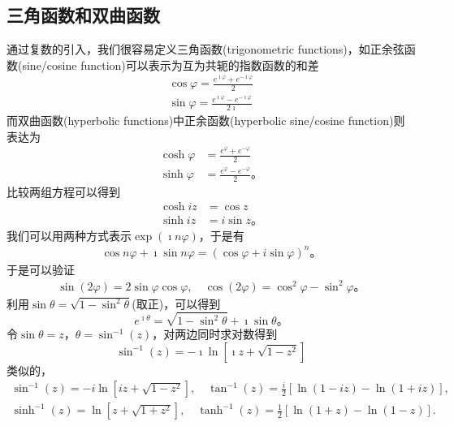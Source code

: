 \subsection{三角函数和双曲函数}
通过复数的引入，我们很容易定义三角函数(trigonometric functions)，如正余弦函数(sine/cosine function)可以表示为互为共轭的指数函数的和差
\begin{align}
    \cos \varphi = \frac{e^{\imath \varphi} + e^{ -\imath \varphi} }{2}
    \\
    \sin \varphi = \frac{e^{\imath \varphi} - e^{ -\imath \varphi} }{2\imath}
\end{align}
而双曲函数(hyperbolic functions)中正余函数(hyperbolic sine/cosine function)则表达为
\begin{align}
    \cosh \varphi &= \frac{e^{\varphi} + e^{ - \varphi} }{2}
    \\
    \sinh \varphi &= \frac{e^{\varphi} - e^{ - \varphi} }{2} \textrm{。}
\end{align}
比较两组方程可以得到
\begin{align}
    \cosh iz &= \cos z
    \\
    \sinh iz &= i \sin z\textrm{。}
\end{align}
我们可以用两种方式表示$\exp(\imath n \varphi)$，于是有
\begin{align}
    \cos n \varphi + \imath \sin n\varphi = (\cos \varphi + i \sin \varphi)^n  \textrm{。}
\end{align}
于是可以验证
\begin{align}
    \sin(2\varphi) = 2\sin\varphi \cos\varphi, \quad \cos (2\varphi) = \cos^2\varphi - \sin^2\varphi \textrm{。}
\end{align}
利用$\sin \theta = \sqrt{1 - \sin ^2 \theta }$(取正)，可以得到
\begin{equation}
  e^{\imath \theta} = \sqrt{ 1 - \sin ^2 \theta } + \imath \sin \theta \textrm{。}  
\end{equation} 
令$\sin \theta = z$，$\theta = \sin^{-1} (z)$，对两边同时求对数得到
\begin{equation}
    \sin^{-1} (z) = -\imath \ln \left[ \imath z + \sqrt{1-z^2} \right]
\end{equation}
类似的，
\begin{equation}
    \begin{array}{cc}
    \sin ^{-1}(z)=-i \ln \left[i z+\sqrt{1-z^2}\right], \quad \tan ^{-1}(z)=\frac{i}{2}[\ln (1-i z)-\ln (1+i z)], \\
    \sinh ^{-1}(z)=\ln \left[z+\sqrt{1+z^2}\right], \quad \tanh ^{-1}(z)=\frac{1}{2}[\ln (1+z)-\ln (1-z)] .
    \end{array}
\end{equation}

